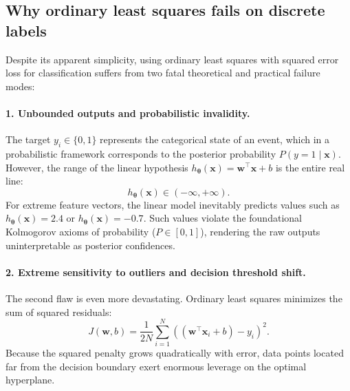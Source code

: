 \subsection{Why ordinary least squares fails on discrete labels}
\label{sec:least_squares_failure}

Despite its apparent simplicity, using ordinary least squares with squared error loss for classification suffers from two fatal theoretical and practical failure modes:

\paragraph{1. Unbounded outputs and probabilistic invalidity.}
The target $y_i \in \{0, 1\}$ represents the categorical state of an event, which in a probabilistic framework corresponds to the posterior probability $P(y=1 \mid \mathbf{x})$. However, the range of the linear hypothesis $h_{\boldsymbol{\theta}}(\mathbf{x}) = \mathbf{w}^\top \mathbf{x} + b$ is the entire real line:
\begin{equation}
h_{\boldsymbol{\theta}}(\mathbf{x}) \in (-\infty, +\infty).
\end{equation}
For extreme feature vectors, the linear model inevitably predicts values such as $h_{\boldsymbol{\theta}}(\mathbf{x}) = 2.4$ or $h_{\boldsymbol{\theta}}(\mathbf{x}) = -0.7$. Such values violate the foundational Kolmogorov axioms of probability ($P \in [0, 1]$), rendering the raw outputs uninterpretable as posterior confidences.

\paragraph{2. Extreme sensitivity to outliers and decision threshold shift.}
The second flaw is even more devastating. Ordinary least squares minimizes the sum of squared residuals:
\begin{equation}
J(\mathbf{w}, b) = \frac{1}{2N} \sum_{i=1}^N \left( (\mathbf{w}^\top \mathbf{x}_i + b) - y_i \right)^2.
\end{equation}
Because the squared penalty grows quadratically with error, data points located far from the decision boundary exert enormous leverage on the optimal hyperplane.

